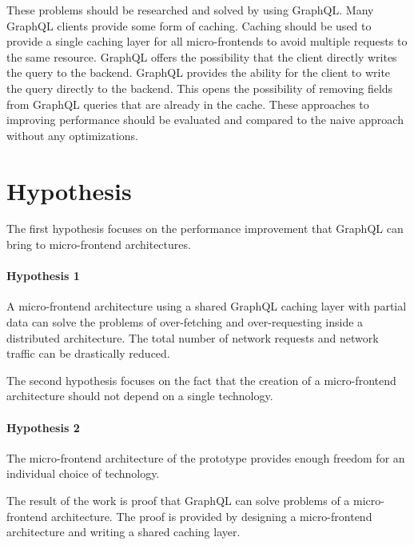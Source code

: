 \bigskip

\noindent These problems should be researched and solved by using GraphQL. Many GraphQL clients provide some form of caching. Caching should be used to provide a single caching layer for all micro-frontends to avoid multiple requests to the same resource. GraphQL offers the possibility that the client directly writes the query to the backend. GraphQL provides the ability for the client to write the query directly to the backend. This opens the possibility of removing fields from GraphQL queries that are already in the cache. These approaches to improving performance should be evaluated and compared to the naive approach without any optimizations.

\section{Hypothesis}\label{section:introduction:hypothesis}

The first hypothesis focuses on the performance improvement that GraphQL can bring to micro-frontend architectures.

\paragraph{Hypothesis 1} 
A micro-frontend architecture using a shared GraphQL caching layer with partial data can solve the problems of over-fetching and over-requesting inside a distributed architecture. The total number of network requests and network traffic can be drastically reduced.

\bigskip

\noindent The second hypothesis focuses on the fact that the creation of a micro-frontend architecture should not depend on a single technology.

\paragraph{Hypothesis 2}
The micro-frontend architecture of the prototype provides enough freedom for an individual choice of technology.

\bigskip

\noindent The result of the work is proof that GraphQL can solve problems of a micro-frontend architecture. The proof is provided by designing a micro-frontend architecture and writing a shared caching layer.
